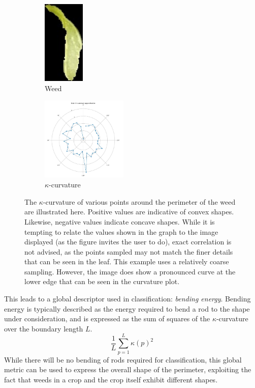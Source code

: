 \documentclass[letterpaper]{report}
\begin{document}
{  \begin{figure}[h!]
	\centering
	\begin{subfigure}[h]{.4\textwidth}
	  \centering
	  \includegraphics[height=4cm]{./figures/for-curvature-blob-1.jpg}
	  \caption{Weed}
	  \label{fig:curvature-weed}
	\end{subfigure}
	\begin{subfigure}[h]{.4\textwidth}
	  \centering
	  \includegraphics[height=4cm]{./figures/curvature-blob-1.jpg}
	  \caption{$\kappa$-curvature}
	  \label{fig:curvature-plot}
	\end{subfigure}
	\caption[Example of $\kappa$-curvature]{The $\kappa$-curvature of various points around the perimeter of the weed are illustrated here. Positive values are indicative of convex shapes. Likewise, negative values indicate concave shapes.  While it is tempting to relate the values shown in the graph to the image displayed (as the figure invites the user to do), exact correlation is not advised, as the points sampled may not match the finer details that can be seen in the leaf. This example uses a relatively coarse sampling. However, the image does show a pronounced curve at the lower edge that can be seen in the curvature plot.}
	\label{fig:curvature}
\end{figure}
This leads to a global descriptor used in classification: \textit{bending energy}. Bending energy is typically described as the energy required to bend a rod to the shape under consideration, and is expressed as the sum of squares of the $\kappa$-curvature over the boundary length $L$.
\begin{equation}
\frac{1}{L} \sum_{p=1}^{L}\kappa(p)^2
\end{equation}
While there will be no bending of rods required for classification, this global metric can be used to express the overall shape of the perimeter, exploiting the fact that weeds in a crop and the crop itself exhibit different shapes.

}
\end{document}
